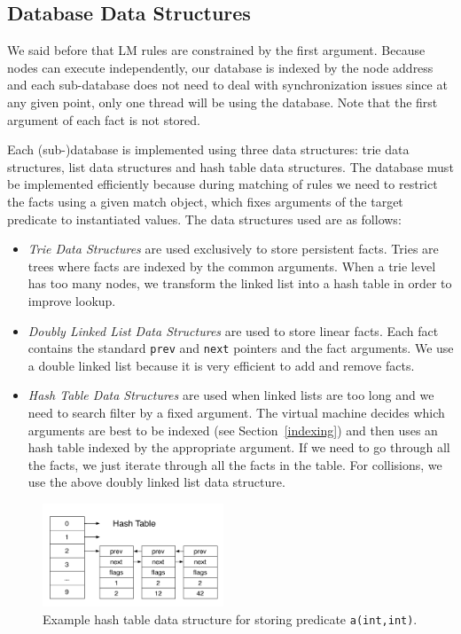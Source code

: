 \subsection{Database Data Structures}\label{sec:database}

We said before that LM rules are constrained by the first argument. Because nodes can execute
independently, our database is indexed by the node address and each sub-database does not
need to deal with synchronization issues since at any given point, only one thread will be using
the database. Note that the first argument of each fact is not stored.

Each (sub-)database is implemented using three data structures: trie data structures, list data structures and hash table data structures.
The database must be implemented efficiently because during matching of rules we need
to restrict the facts using a given match object, which fixes arguments of the target predicate to instantiated values. The data structures used are as follows:

\begin{itemize}
   \item \emph{Trie Data Structures} are used exclusively to store persistent facts.
   Tries are trees where facts are indexed by the common arguments. When a trie level has too many nodes, we
   transform the linked list into a hash table in order to improve lookup.
      
   \item \emph{Doubly Linked List Data Structures} are used to store linear facts.
   Each fact contains the standard \texttt{prev} and \texttt{next} pointers
   and the fact arguments. We use a double linked list because it is very efficient to add and remove facts.
   
   \item \emph{Hash Table Data Structures} are used when linked lists are too long and we need to search filter by a fixed argument. The virtual machine decides which arguments are best to be indexed
   (see Section~\ref{indexing}) and then
   uses an hash table indexed by the appropriate argument. If we need to go through all the facts, we just iterate through all the facts in the table. For collisions, we use the above doubly linked list data structure.
\end{itemize}

\begin{figure}
   \vspace{-1\intextsep}
   \centering
   \includegraphics[width=0.48\textwidth]{hash_table.pdf}
   \caption{Example hash table data structure for storing predicate \texttt{a(int,int)}.}
   \label{fig:hash_table}
   \vspace{-1.5\intextsep}
\end{figure}

